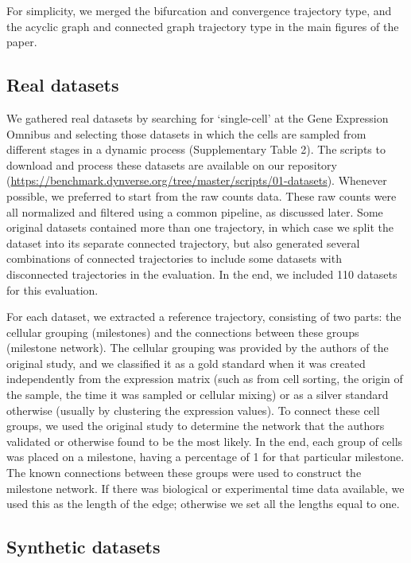 For simplicity, we merged the bifurcation and convergence trajectory type, and the acyclic graph and connected graph trajectory type in the main figures of the paper.


\subsection{Real datasets}

We gathered real datasets by searching for ‘single-cell’ at the Gene Expression Omnibus and selecting those datasets in which the cells are sampled from different stages in a dynamic process (Supplementary Table 2). The scripts to download and process these datasets are available on our repository (\href{https://benchmark.dynverse.org/tree/master/scripts/01-datasets}{https://benchmark.dynverse.org/tree/master/scripts/01-datasets}). Whenever possible, we preferred to start from the raw counts data. These raw counts were all normalized and filtered using a common pipeline, as discussed later. Some original datasets contained more than one trajectory, in which case we split the dataset into its separate connected trajectory, but also generated several combinations of connected trajectories to include some datasets with disconnected trajectories in the evaluation. In the end, we included 110 datasets for this evaluation.

For each dataset, we extracted a reference trajectory, consisting of two parts: the cellular grouping (milestones) and the connections between these groups (milestone network). The cellular grouping was provided by the authors of the original study, and we classified it as a gold standard when it was created independently from the expression matrix (such as from cell sorting, the origin of the sample, the time it was sampled or cellular mixing) or as a silver standard otherwise (usually by clustering the expression values). To connect these cell groups, we used the original study to determine the network that the authors validated or otherwise found to be the most likely. In the end, each group of cells was placed on a milestone, having a percentage of 1 for that particular milestone. The known connections between these groups were used to construct the milestone network. If there was biological or experimental time data available, we used this as the length of the edge; otherwise we set all the lengths equal to one.

\subsection{Synthetic datasets}

